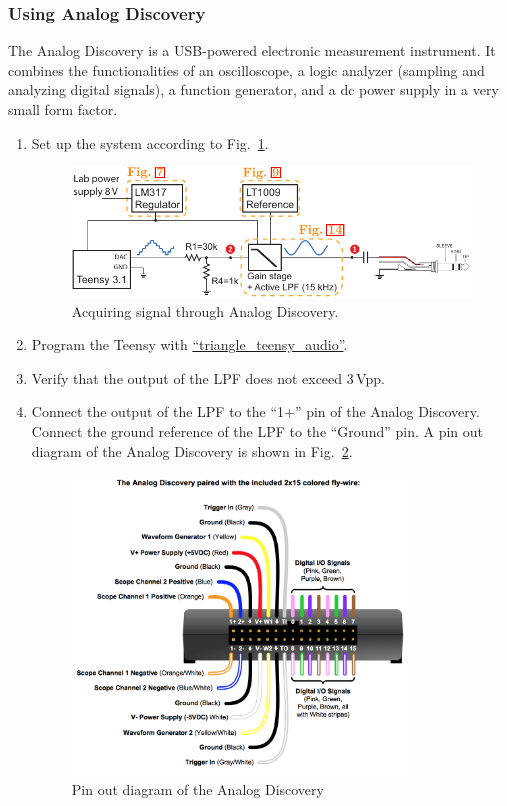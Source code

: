 \documentclass[letterpaper, 11pt]{article}
\begin{document}
\subsubsection{Using Analog Discovery}
\label{sec:soundcard}

The Analog Discovery is a USB-powered electronic measurement instrument. It combines the functionalities of an oscilloscope, a logic analyzer (sampling and analyzing digital signals), a function generator, and a dc power supply in a very small form factor. 
\begin{enumerate}
	\item Set up the system according to Fig.~\ref{fig:audio-1}.
	\begin{figure}[h]
		\centering
		\includegraphics{audio-1.pdf}
		\caption{Acquiring signal through Analog Discovery.}
		\label{fig:audio-1}
	\end{figure}
	
	\item Program the Teensy with \href{https://github.com/ucdart/UCD-EEC134/blob/master/labs/lab1/code/triangle_teensy_audio/triangle_teensy_audio.ino}{``triangle\_teensy\_audio''}. 
	
	\item Verify that the output of the LPF does not exceed 3\,Vpp. 	
	
	\item Connect the output of the LPF to the ``1+'' pin of the Analog Discovery. Connect the ground reference of the LPF to the ``Ground'' pin. A pin out diagram of the Analog Discovery is shown in Fig.~\ref{fig:ad_pinout}.
	
	\begin{figure}[h]
		\centering
		\includegraphics[width=3.5in]{ad_pinout}
		\caption{Pin out diagram of the Analog Discovery}
		\label{fig:ad_pinout}
	\end{figure}
	

\end{enumerate}
\end{document}
